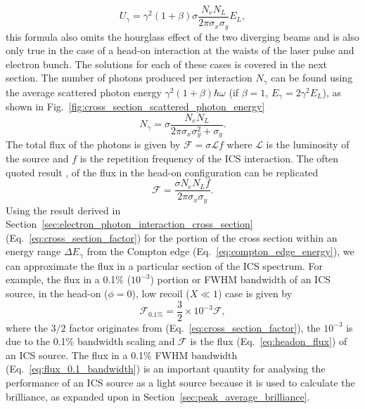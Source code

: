 \documentclass[../main.tex]{subfiles}
\begin{document}
\begin{equation}
U_{\gamma} = \gamma^{2}\left(1+\beta\right)\sigma\frac{N_{e}N_{L}}{2\pi\sigma_{x}\sigma_{y}}E_{L},
\label{eq:total_interaction_energy_simplified}
\end{equation}
this formula also omits the hourglass effect of the two diverging beams and is also only true in the case of a head-on interaction at the waists of the laser pulse and electron bunch. The solutions for each of these cases is covered in the next section. The number of photons produced per interaction $N_{\gamma}$ can be found using the average scattered photon energy $\gamma^{2}\left(1+\beta\right)\hbar\omega$ (if $\beta=1$, $E_{\gamma} = 2\gamma^{2}E_{L}$), as shown in Fig.~\ref{fig:cross_section_scattered_photon_energy} 
\begin{equation}
N_{\gamma} = \sigma\frac{N_{e}N_{L}}{2\pi\sigma_{x}\sigma_{y}^{2}+\sigma_{y}}.
\label{eq:no_photon_headon}
\end{equation}
The total flux of the photons is given by $\mathcal{F} = \sigma\mathcal{L}f$ where $\mathcal{L}$ is the luminosity of the source and $f$ is the repetition frequency of the ICS interaction. The often quoted result \cite{krafft2010compton,curatolo2017analytical}, of the flux in the head-on configuration can be replicated
\begin{equation}
\mathcal{F} = \frac{\sigma N_{e}N_{L}f}{2\pi\sigma_{x}\sigma_{y}}.
\label{eq:headon_flux}
\end{equation}
Using the result derived in Section~\ref{sec:electron_photon_interaction_cross_section} (Eq.~\ref{eq:cross_section_factor}) for the portion of the cross section within an energy range $\Delta E_{\gamma}$ from the Compton edge (Eq.~\ref{eq:compton_edge_energy}), we can approximate the flux in a particular section of the ICS spectrum. For example, the flux in a 0.1\% ($10^{-3}$) portion or FWHM bandwidth of an ICS source, in the head-on ($\phi=0$), low recoil ($X \ll 1$) case is given by
\begin{equation}
\mathcal{F}_{0.1\%} = \frac{3}{2}\times 10^{-3} \mathcal{F},
\label{eq:flux_0.1_bandwidth}    
\end{equation}
where the $3/2$ factor originates from (Eq.~\ref{eq:cross_section_factor}), the $10^{-3}$ is due to the 0.1\% bandwidth scaling and $\mathcal{F}$ is the flux (Eq.~\ref{eq:headon_flux}) of an ICS source. The flux in a 0.1\% FWHM bandwidth (Eq.~\ref{eq:flux_0.1_bandwidth}) is an important quantity for analysing the performance of an ICS source as a light source because it is used to calculate the brilliance, as expanded upon in Section~\ref{sec:peak_average_brilliance}. 
\end{document}
